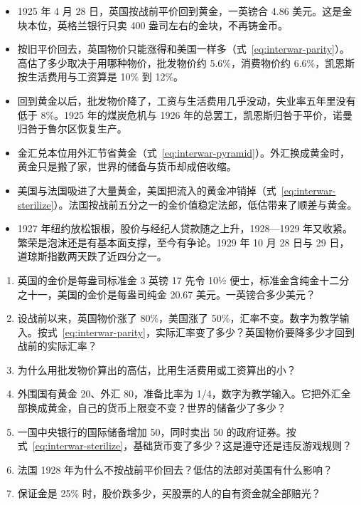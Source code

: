 \begin{takeaways}
\begin{itemize}
\item 1925 年 4 月 28 日，英国按战前平价回到黄金，一英镑合 4.86 美元。这是金块本位，英格兰银行只卖 400 盎司左右的金块，不再铸金币。
\item 按旧平价回去，英国物价只能涨得和美国一样多（式~\eqref{eq:interwar-parity}）。高估了多少取决于用哪种物价，批发物价约 5.6\%，消费物价约 6.6\%，凯恩斯按生活费用与工资算是 10\% 到 12\%。
\item 回到黄金以后，批发物价降了，工资与生活费用几乎没动，失业率五年里没有低于 8\%。1925 年的煤炭危机与 1926 年的总罢工，凯恩斯归咎于平价，诺曼归咎于鲁尔区恢复生产。
\item 金汇兑本位用外汇节省黄金（式~\eqref{eq:interwar-pyramid}）。外汇换成黄金时，黄金只是搬了家，世界的储备与货币却成倍收缩。
\item 美国与法国吸进了大量黄金，美国把流入的黄金冲销掉（式~\eqref{eq:interwar-sterilize}）。法国按战前五分之一的金价值稳定法郎，低估带来了顺差与黄金。
\item 1927 年纽约放松银根，股价与经纪人贷款随之上升，1928—1929 年又收紧。繁荣是泡沫还是有基本面支撑，至今有争论。1929 年 10 月 28 日与 29 日，道琼斯指数两天跌了近四分之一。
\end{itemize}
\end{takeaways}

\begin{selfcheck}
\begin{enumerate}
\item 英国的金价是每盎司标准金 3 英镑 17 先令 10½ 便士，标准金含纯金十二分之十一，美国的金价是每盎司纯金 20.67 美元。一英镑合多少美元？
\item 设战前以来，英国物价涨了 80\%，美国涨了 50\%，汇率不变。数字为教学输入。按式~\eqref{eq:interwar-parity}，实际汇率变了多少？英国物价要降多少才回到战前的实际汇率？
\item 为什么用批发物价算出的高估，比用生活费用或工资算出的小？
\item 外围国有黄金 20、外汇 80，准备比率为 1/4，数字为教学输入。它把外汇全部换成黄金，自己的货币上限变不变？世界的储备少了多少？
\item 一国中央银行的国际储备增加 50，同时卖出 50 的政府证券。按式~\eqref{eq:interwar-sterilize}，基础货币变了多少？这是遵守还是违反游戏规则？
\item 法国 1928 年为什么不按战前平价回去？低估的法郎对英国有什么影响？
\item 保证金是 25\% 时，股价跌多少，买股票的人的自有资金就全部赔光？
\end{enumerate}
\end{selfcheck}

